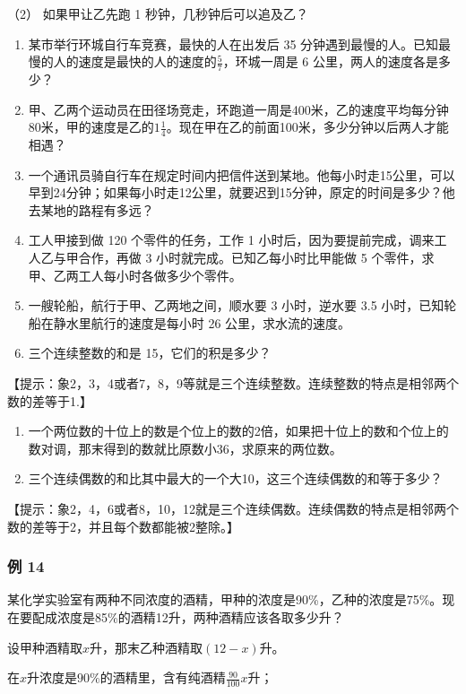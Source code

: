（2） 如果甲让乙先跑 1 秒钟，几秒钟后可以追及乙？

\begin{enumerate}[start=2]
\item
  某市举行环城自行车竞赛，最快的人在出发后 35
  分钟遇到最慢的人。已知最慢的人的速度是最快的人的速度的\(\frac{5}{7}\)，环城一周是
  6 公里，两人的速度各是多少？
\item
  甲、乙两个运动员在田径场竞走，环跑道一周是400米，乙的速度平均每分钟80米，甲的速度是乙的\(1\frac{1}{4}\)。现在甲在乙的前面100米，多少分钟以后两人才能相遇？
\item
  一个通讯员骑自行车在规定时间内把信件送到某地。他每小时走15公里，可以早到24分钟；如果每小时走12公里，就要迟到15分钟，原定的时间是多少？他去某地的路程有多远？
\item
  工人甲接到做 120 个零件的任务，工作 1
  小时后，因为要提前完成，调来工人乙与甲合作，再做 3
  小时就完成。已知乙每小时比甲能做 5
  个零件，求甲、乙两工人每小时各做多少个零件。
\item
  一艘轮船，航行于甲、乙两地之间，顺水要 3 小时，逆水要 3.5
  小时，已知轮船在静水里航行的速度是每小时 26 公里，求水流的速度。
\item
  三个连续整数的和是 15，它们的积是多少？
\end{enumerate}

【提示：象2，3，4或者7，8，9等就是三个连续整数。连续整数的特点是相邻两个数的差等于1.】

\begin{enumerate}[start=8]
\item
  一个两位数的十位上的数是个位上的数的2倍，如果把十位上的数和个位上的数对调，那末得到的数就比原数小36，求原来的两位数。
\item
  三个连续偶数的和比其中最大的一个大10，这三个连续偶数的和等于多少？
\end{enumerate}

【提示：象2，4，6或者8，10，12就是三个连续偶数。连续偶数的特点是相邻两个数的差等于2，并且每个数都能被2整除。】

\subsubsection{例 14}

某化学实验室有两种不同浓度的酒精，甲种的浓度是90\%，乙种的浓度是75\%。现在要配成浓度是85\%的酒精12升，两种酒精应该各取多少升？

 设甲种酒精取\(x\)升，那末乙种酒精取\((12 - x)\)升。

在\(x\)升浓度是\(90\%\)的酒精里，含有纯酒精\(\frac{90}{100} x\)升；

